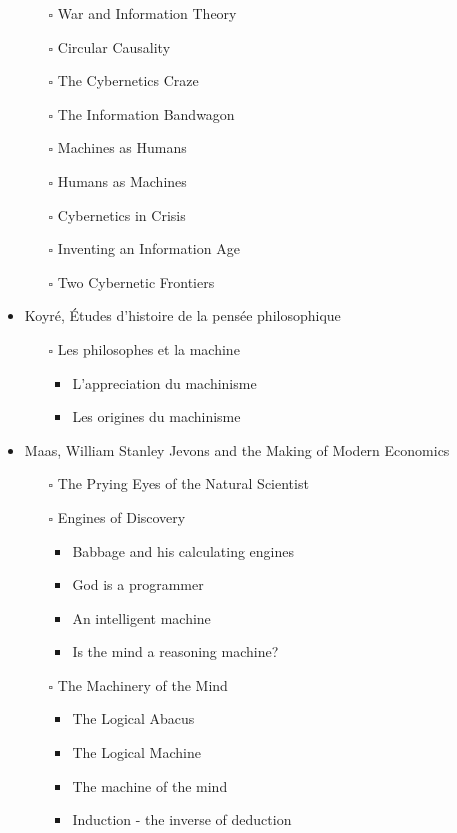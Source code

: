 \documentclass[paper=B6,portrait,twoside=true,twocolumn=false,headinclude=true,footinclude=false,fontsize=12,BCOR=10mm,DIV=calc,pagesize=auto,titlepage=firstiscover,mpinclude=false,headings=normal,headings=twolinechapter,open=right,toc=graduated,chapterprefix=false,numbers=endperiod,parskip=half+]{scrbook}
\theoremstyle{definition}
\begin{document}
\begin{itemize}
\begin{itemize}
\item[{$\square$}] War and Information Theory
\item[{$\square$}] Circular Causality
\item[{$\square$}] The Cybernetics Craze
\item[{$\square$}] The Information Bandwagon
\item[{$\square$}] Machines as Humans
\item[{$\square$}] Humans as Machines
\item[{$\square$}] Cybernetics in Crisis
\item[{$\square$}] Inventing an Information Age
\item[{$\square$}] Two Cybernetic Frontiers
\end{itemize}
\item\relax [0/1] Koyré, Études d'histoire de la pensée philosophique
\begin{itemize}
\item[{$\square$}] Les philosophes et la machine
\begin{itemize}
\item L'appreciation du machinisme
\item Les origines du machinisme
\end{itemize}
\end{itemize}
\item\relax [0/5] Maas, William Stanley Jevons and the Making of Modern Economics
\begin{itemize}
\item[{$\square$}] The Prying Eyes of the Natural Scientist
\item[{$\square$}] Engines of Discovery
\begin{itemize}
\item Babbage and his calculating engines
\item God is a programmer
\item An intelligent machine
\item Is the mind a reasoning machine?
\end{itemize}
\item[{$\square$}] The Machinery of the Mind
\begin{itemize}
\item The Logical Abacus
\item The Logical Machine
\item The machine of the mind
\item Induction - the inverse of deduction

\end{itemize}
\end{itemize}
\end{itemize}
\end{document}
